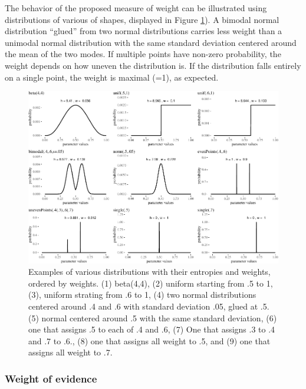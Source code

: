 \documentclass[
  10pt,
  dvipsnames,enabledeprecatedfontcommands]{scrartcl}
\begin{document}
The behavior of the proposed measure of weight can be illustrated using
distributions of various of shapes, displayed in Figure
\ref{fig:weightsWeird}). A bimodal normal distribution ``glued'' from
two normal distributions carries less weight than a unimodal normal
distribution with the same standard deviation centered around the mean
of the two modes. If multiple points have non-zero probability, the
weight depends on how uneven the distribution is. If the distribution
falls entirely on a single point, the weight is maximal (=1), as
expected.

\begin{figure}[H]

\begin{center}\includegraphics[width=1\linewidth]{chapter-outline_files/figure-latex/fig:weightsWeird-1} \end{center}
\caption{Examples of various distributions with their entropies and weights, ordered by weights. (1) beta(4,4), (2) uniform starting from .5 to 1, (3), uniform strating from .6 to 1, (4) two normal distributions centered around .4 and .6 with standard deviation .05, glued at .5. (5) normal centered around .5 with the same standard deviation, (6) one that assigns .5 to each of .4  and .6, (7) One that assigns .3 to .4 and .7 to .6., (8) one that assigns all weight to .5, and (9) one that assigns all weight to .7.}

\label{fig:weightsWeird}
\end{figure}

\hypertarget{weight-of-evidence-1}{%
\subsubsection{Weight of evidence}\label{weight-of-evidence-1}}
\end{document}
